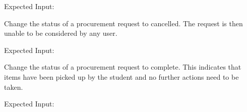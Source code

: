 \documentclass[letterpaper,10pt,english]{sphinxmanual}
\begin{document}
\begin{fulllineitems}
\begin{fulllineitems}
Expected Input:

\begin{sphinxVerbatim}[commandchars=\\\{\}]
     
\end{sphinxVerbatim}

\end{fulllineitems}


\begin{fulllineitems}
\label{\detokenize{apidoc/utdesign_procurement:utdesign_procurement.apigateway.ApiGateway.procurementCancel}}
Change the status of a procurement request to cancelled. The
request is then unable to be considered by any user.

Expected Input:

\begin{sphinxVerbatim}[commandchars=\\\{\}]
     
\end{sphinxVerbatim}

\end{fulllineitems}


\begin{fulllineitems}
\label{\detokenize{apidoc/utdesign_procurement:utdesign_procurement.apigateway.ApiGateway.procurementComplete}}
Change the status of a procurement request to complete. This
indicates that items have been picked up by the student and
no further actions need to be taken.

Expected Input:

\begin{sphinxVerbatim}[commandchars=\\\{\}]
     
\end{sphinxVerbatim}


\end{fulllineitems}
\end{fulllineitems}
\end{document}
